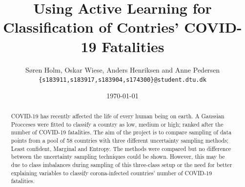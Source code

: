 \documentclass[12pt,fleqn]{article}
\title{\vspace*{-3.75cm} Using Active Learning for Classification of Contries' COVID-19 Fatalities}
\author{Søren Holm, Oskar Wiese, Anders Henriksen and Anne Pedersen \\
\small {\texttt{\{s183911,s183917,s183904,s174300\}@student.dtu.dk}}}
\date{\today}
\begin{document}
\maketitle

\begin{abstract} %
	\noindent COVID-19 has recently affected the life of every human being on earth. A Gaussian Procceses were fitted to classify a country as low, medium or high; ranked after the number of COVID-19 fatalities. The aim of the project is to compare sampling of data points from a pool of 58 countries  with three different uncertainty sampling methods; Least confident, Marginal and Entropy. The methods were compared but no difference between the uncertainty sampling techniques could be shown. However, this may be due to class imbalances during sampling of this three-class setup or the need for better explaining variables to classify corona-infected countries' number of COVID-19 fatalities.
\end{abstract}
\end{document}
